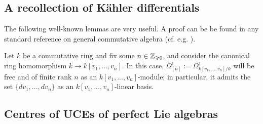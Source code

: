         \subsection{A recollection of K\"ahler differentials}
            \begin{definition} \label{def: kahler_differentials}
                
            \end{definition}
            The following well-known lemmas are very useful. A proof can be be found in any standard reference on general commutative algebra (cf. e.g. \cite[\href{https://stacks.math.columbia.edu/tag/00AO}{Tag 00AO}]{stacks}).
            \begin{lemma}
                \cite[\href{https://stacks.math.columbia.edu/tag/00RX}{Tag 00RX}]{stacks} Let $k$ be a commutative ring and fix some $n \in \mathbb{Z}_{\geqslant 0}$, and consider the canonical ring homomorphism $k \to k[v_1, ..., v_n]$. In this case, $\Omega^1_{[n]} := \Omega^1_{k[v_1, ..., v_n]/k}$ will be free and of finite rank $n$ as an $k[v_1, ..., v_n]$-module; in particular, it admits the set $\{dv_1, ..., dv_n\}$ as an $k[v_1, ..., v_n]$-linear basis. 
            \end{lemma}

        \subsection{Centres of UCEs of perfect Lie algebras}
            \begin{example}
                
            \end{example}
    
    \printbibliography

